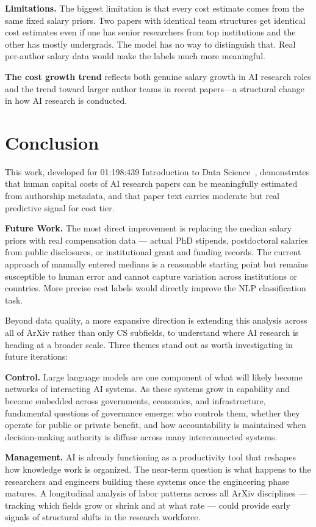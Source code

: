 \documentclass{article}
\begin{document}
\textbf{Limitations.}
The biggest limitation is that every cost estimate comes from the same fixed salary priors. Two papers with identical team structures get identical cost estimates even if one has senior researchers from top institutions and the other has mostly undergrads. The model has no way to distinguish that. Real per-author salary data would make the labels much more meaningful.

\textbf{The cost growth trend} reflects both genuine salary growth in AI research roles and the trend toward larger author teams in recent papers---a structural change in how AI research is conducted.

\section{Conclusion}

This work, developed for 01:198:439 Introduction to Data Science~\cite{wang2026course}, demonstrates that human capital costs of AI research papers can be meaningfully estimated from authorship metadata, and that paper text carries moderate but real predictive signal for cost tier.

\textbf{Future Work.}
The most direct improvement is replacing the median salary priors with real compensation data — actual PhD stipends, postdoctoral salaries from public disclosures, or institutional grant and funding records. The current approach of manually entered medians is a reasonable starting point but remains susceptible to human error and cannot capture variation across institutions or countries. More precise cost labels would directly improve the NLP classification task.

Beyond data quality, a more expansive direction is extending this analysis across all of ArXiv rather than only CS subfields, to understand where AI research is heading at a broader scale. Three themes stand out as worth investigating in future iterations:

\textbf{Control.} Large language models are one component of what will likely become networks of interacting AI systems. As these systems grow in capability and become embedded across governments, economies, and infrastructure, fundamental questions of governance emerge: who controls them, whether they operate for public or private benefit, and how accountability is maintained when decision-making authority is diffuse across many interconnected systems.

\textbf{Management.} AI is already functioning as a productivity tool that reshapes how knowledge work is organized. The near-term question is what happens to the researchers and engineers building these systems once the engineering phase matures. A longitudinal analysis of labor patterns across all ArXiv disciplines — tracking which fields grow or shrink and at what rate — could provide early signals of structural shifts in the research workforce.
\end{document}
